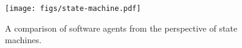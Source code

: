 \begin{figure}
    \centering
     \texttt{[image: figs/state-machine.pdf]}
    \caption{A comparison of software agents from the perspective of state machines.}
    \label{fig:states}
\end{figure}